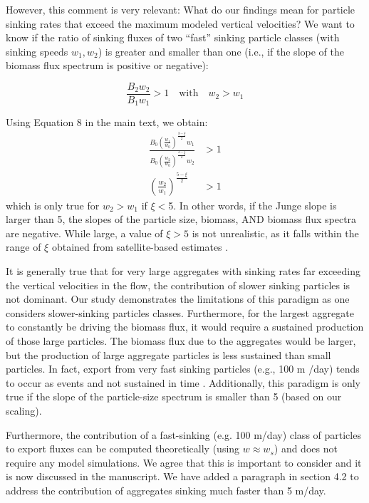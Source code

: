 \documentclass[12pt,letter]{article}
\begin{document}
{\color{blue}
	However, this comment is very relevant: What do our findings mean for particle sinking rates that exceed the maximum modeled vertical velocities?
	We want to know if the ratio of sinking fluxes of two ``fast'' sinking particle classes (with sinking speeds $w_1, w_2$) is greater and smaller than one (i.e., if the slope of the biomass flux spectrum is positive or negative):

\begin{equation}
	\frac{B_2w_2}{B_1w_1} >1 \quad \text{with} \quad w_2 > w_1
\end{equation}

Using Equation 8 in the main text, we obtain:
\begin{align}
	\frac{B_0\left(\frac{w_1}{w_0}\right)^{\frac{3-\xi}{2}}w_1}{B_0\left(\frac{w_2}{w_0}\right)^{\frac{3-\xi}{2}}w_2} &> 1\\[.2cm]
	\left(\frac{w_2}{w_1}\right)^{\frac{5-\xi}{2}} &>1
\end{align}
which is only true for $w_2 > w_1$ if $\xi<$5. In other words, if the Junge slope is larger than 5, the slopes of the particle size, biomass, AND biomass flux spectra are negative. While large, a value of $\xi>5$ is not unrealistic, as it falls within the range of $\xi$ obtained from satellite-based estimates \citep{Kostadinov_2009}.

It is generally true that for very large aggregates with sinking rates far exceeding the vertical velocities in the flow, the contribution of slower sinking particles is not dominant. Our study demonstrates the limitations of this paradigm as one considers slower-sinking particles classes. Furthermore, for the largest aggregate to constantly be driving the biomass flux, it would require a sustained production of those large particles. The biomass flux due to the aggregates would be larger, but the production of large aggregate particles is less sustained than small particles.   In fact, export from very fast sinking particles (e.g., 100 m /day) tends to occur as events and  not sustained in time \citep{Kiko_2017}.
Additionally, this paradigm is only true if the slope of the particle-size spectrum is smaller than 5 (based on our scaling).

Furthermore, the contribution of a fast-sinking (e.g. 100 m/day) class of particles to export fluxes can be computed theoretically (using $w \approx w_s$) and does not require any model simulations. We agree that this is important to consider and it is now discussed in the manuscript. We have added a paragraph in section 4.2 to address the contribution of aggregates sinking much faster than 5 m/day.}
\end{document}
